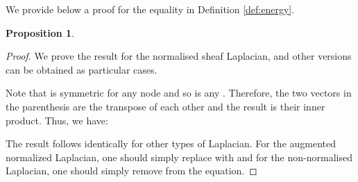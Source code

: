 \documentclass{article}
\newtheorem{proposition}[theorem]{Proposition}
\begin{document}
We provide below a proof for the equality in Definition \ref{def:energy}. 
\begin{proposition}

\end{proposition}

\begin{proof}We prove the result for the normalised sheaf Laplacian, and other versions can be obtained as particular cases. 

Note that  is symmetric for any node  and so is any . Therefore, the two vectors in the parenthesis are the transpose of each other and the result is their inner product. Thus, we have:

The result follows identically for other types of Laplacian. For the augmented normalized Laplacian, one should simply replace  with  and for the non-normalised Laplacian, one should simply remove  from the equation. \end{proof}
\end{document}
